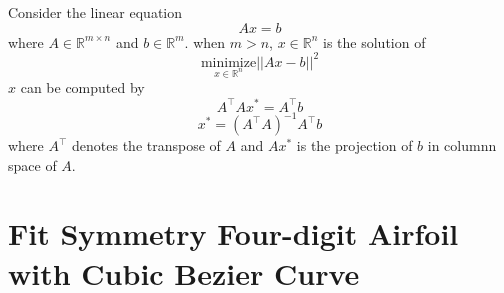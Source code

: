 \documentclass{turgon}
\begin{document}
Consider the linear equation
\begin{equation}
    Ax = b
    \label{e:lls:leq}
\end{equation}
where $A \in \mathbb{R}^{m \times n}$ and $b \in \mathbb{R}^m$. when $m>n$,
$x \in \mathbb{R}^n$ is the solution of
\begin{equation*}
    \underset{x \in \mathbb{R}^n}{\text{minimize}} ||A x - b||^2
\end{equation*}
$x$ can be computed by
\begin{equation*}
    A^\top A x^* = A^\top b
\end{equation*}
\begin{equation*}
    x^* = (A^\top A)^{-1} A^\top b
    \label{e:lls:sol}
\end{equation*}
where $A^\top$ denotes the transpose of $A$ and $Ax^*$ is the projection of
$b$ in columnn space of $A$.

\chapter{Fit Symmetry Four-digit Airfoil with Cubic Bezier Curve}

\end{document}
